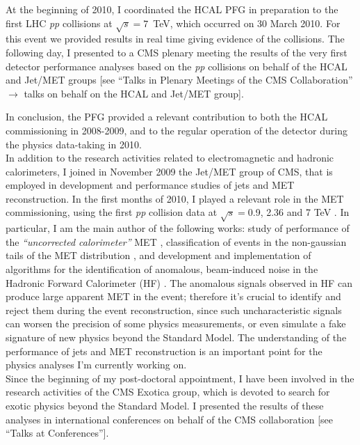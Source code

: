 \documentclass[10pt, a4paper]{article}
\begin{document}
At the beginning of 2010, I coordinated the HCAL PFG in preparation to the first LHC {\it pp} collisions at $\sqrt{s}=7$~TeV, 
which occurred on 30 March 2010. For this event we provided 
results in real time giving evidence of the collisions. The following day, I presented to a CMS plenary meeting the results 
of the very first detector performance analyses based on the {\it pp} collisions on behalf of the HCAL and Jet/MET groups
[see ``Talks in Plenary Meetings of the CMS Collaboration'' $\rightarrow$ talks on behalf on the HCAL and Jet/MET group]. 

In conclusion, the PFG provided a relevant contribution to both the HCAL commissioning in 2008-2009, 
and to the regular operation of the detector during the physics data-taking in 2010. \\

In addition to the research activities related to electromagnetic and hadronic calorimeters, I joined in November 2009 
the Jet/MET group of CMS, that is employed in development and performance studies of jets and MET reconstruction. 
In the first months of 2010, I played a relevant role in the MET commissioning, using the first {\it pp} collision data 
at $\sqrt{s}=$0.9, 2.36 \cite{JME-10-002} and 7 TeV \cite{JME-10-004}. In particular, I am the main author of the following works:
study of performance of the {\it ``uncorrected calorimeter''} MET \cite{AN-2010-029}, 
classification of events in the non-gaussian tails of the MET distribution \cite{AN-2010-219}, 
and development and implementation of algorithms for the identification of anomalous, beam-induced noise in the 
Hadronic Forward Calorimeter (HF) \cite{DN-2010-008}. The anomalous signals
observed in HF can produce large apparent MET in the event; therefore it's crucial to identify and reject them during the event reconstruction, 
since such uncharacteristic signals can worsen the precision of some physics measurements, or even simulate a fake signature 
of new physics beyond the Standard Model. The understanding of the performance of jets and MET reconstruction is 
an important point for the physics analyses I'm currently working on. \\

Since the beginning of my post-doctoral appointment, I have been involved in the research activities of the 
CMS Exotica group, which is devoted to search for exotic physics beyond the Standard Model. I presented 
the results of these analyses in international conferences on behalf of the CMS collaboration [see ``Talks at Conferences'']. \\
\end{document}
